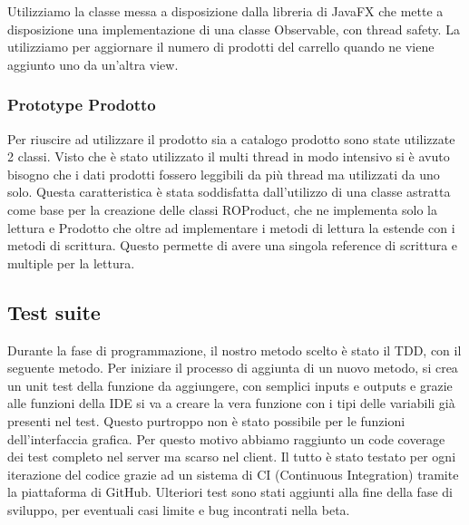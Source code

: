 \documentclass[12pt, a4paper]{report}
\begin{document}
Utilizziamo la classe messa a disposizione dalla libreria di JavaFX che mette
a disposizione una implementazione di una classe Observable, con thread safety.
La utilizziamo per aggiornare il numero di prodotti del carrello quando ne
viene aggiunto uno da un'altra view.

\subsubsection{Prototype Prodotto}

Per riuscire ad utilizzare il prodotto sia a catalogo prodotto sono state
utilizzate 2 classi. Visto che è stato utilizzato il multi thread in modo
intensivo si è avuto bisogno che i dati prodotti fossero leggibili da più
thread ma utilizzati da uno solo. Questa caratteristica è stata soddisfatta
dall'utilizzo di una classe astratta come base per la creazione delle classi
ROProduct, che ne implementa solo la lettura e Prodotto che oltre ad
implementare i metodi di lettura la estende con i metodi di scrittura. Questo
permette di avere una singola reference di scrittura e multiple per la lettura.

\subsection{Test suite}

Durante la fase di programmazione, il nostro metodo scelto è stato il TDD, con
il seguente metodo. Per iniziare il processo di aggiunta di un nuovo metodo, si
crea un unit test della funzione da aggiungere, con semplici inputs e outputs e
grazie alle funzioni della IDE si va a creare la vera funzione con i tipi delle
variabili già presenti nel test. Questo purtroppo non è stato possibile per le
funzioni dell'interfaccia grafica. Per questo motivo abbiamo raggiunto un code
coverage dei test completo nel server ma scarso nel client. Il tutto è stato
testato per ogni iterazione del codice grazie ad un sistema di CI (Continuous
Integration) tramite la piattaforma di GitHub. Ulteriori test sono stati
aggiunti alla fine della fase di sviluppo, per eventuali casi limite e bug
incontrati nella beta.



\end{document}
